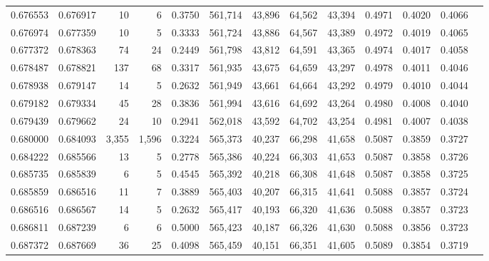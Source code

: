 \begin{tabular}{rrrrrrrrrrrrr}
0.676553 & 0.676917 &     10 &     6 &                                     0.3750 & 561,714 &  43,896 &  64,562 &  43,394 & 0.4971 & 0.4020 & 0.4066 \\
0.676974 & 0.677359 &     10 &     5 &                                     0.3333 & 561,724 &  43,886 &  64,567 &  43,389 & 0.4972 & 0.4019 & 0.4065 \\
0.677372 & 0.678363 &     74 &    24 &                                     0.2449 & 561,798 &  43,812 &  64,591 &  43,365 & 0.4974 & 0.4017 & 0.4058 \\
0.678487 & 0.678821 &    137 &    68 &                                     0.3317 & 561,935 &  43,675 &  64,659 &  43,297 & 0.4978 & 0.4011 & 0.4046 \\
0.678938 & 0.679147 &     14 &     5 &                                     0.2632 & 561,949 &  43,661 &  64,664 &  43,292 & 0.4979 & 0.4010 & 0.4044 \\
0.679182 & 0.679334 &     45 &    28 &                                     0.3836 & 561,994 &  43,616 &  64,692 &  43,264 & 0.4980 & 0.4008 & 0.4040 \\
0.679439 & 0.679662 &     24 &    10 &                                     0.2941 & 562,018 &  43,592 &  64,702 &  43,254 & 0.4981 & 0.4007 & 0.4038 \\
0.680000 & 0.684093 &  3,355 & 1,596 &                                     0.3224 & 565,373 &  40,237 &  66,298 &  41,658 & 0.5087 & 0.3859 & 0.3727 \\
0.684222 & 0.685566 &     13 &     5 &                                     0.2778 & 565,386 &  40,224 &  66,303 &  41,653 & 0.5087 & 0.3858 & 0.3726 \\
0.685735 & 0.685839 &      6 &     5 &                                     0.4545 & 565,392 &  40,218 &  66,308 &  41,648 & 0.5087 & 0.3858 & 0.3725 \\
0.685859 & 0.686516 &     11 &     7 &                                     0.3889 & 565,403 &  40,207 &  66,315 &  41,641 & 0.5088 & 0.3857 & 0.3724 \\
0.686516 & 0.686567 &     14 &     5 &                                     0.2632 & 565,417 &  40,193 &  66,320 &  41,636 & 0.5088 & 0.3857 & 0.3723 \\
0.686811 & 0.687239 &      6 &     6 &                                     0.5000 & 565,423 &  40,187 &  66,326 &  41,630 & 0.5088 & 0.3856 & 0.3723 \\
0.687372 & 0.687669 &     36 &    25 &                                     0.4098 & 565,459 &  40,151 &  66,351 &  41,605 & 0.5089 & 0.3854 & 0.3719 \\

\end{tabular}

